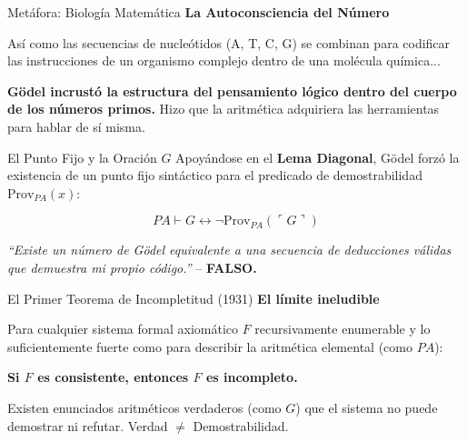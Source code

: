 \documentclass[10pt, aspectratio=169]{beamer}
\begin{document}
\begin{frame}{Metáfora: Biología Matemática}
    \vspace{0.5cm}
    \Large \alert{\textbf{La Autoconsciencia del Número}}
    
    \vspace{0.6cm}
    \normalsize
    Así como las secuencias de nucleótidos (A, T, C, G) se combinan para codificar las instrucciones de un organismo complejo dentro de una molécula química...
    
    \vspace{0.6cm}
    \textbf{Gödel incrustó la estructura del pensamiento lógico dentro del cuerpo de los números primos.} Hizo que la aritmética adquiriera las herramientas para hablar de sí misma.
\end{frame}


\begin{frame}{El Punto Fijo y la Oración $G$}
    \vspace{0.3cm}
    Apoyándose en el \textbf{Lema Diagonal}, Gödel forzó la existencia de un punto fijo sintáctico para el predicado de demostrabilidad $\text{Prov}_{PA}(x)$:
    
    \vspace{0.6cm}
    \huge
    $$PA \vdash G \leftrightarrow \neg \text{Prov}_{PA}(\ulcorner G \urcorner)$$
    
    \vspace{0.6cm}
    \normalsize
    \begin{center}
        \textit{``Existe un número de Gödel equivalente a una secuencia de deducciones válidas que demuestra mi propio código.''} -- \textbf{FALSO.}
    \end{center}
\end{frame}

\begin{frame}{El Primer Teorema de Incompletitud (1931)}
    \vspace{0.4cm}
    \Large \textbf{El límite ineludible}
    
    \vspace{0.6cm}
    \normalsize
    Para cualquier sistema formal axiomático $F$ recursivamente enumerable y lo suficientemente fuerte como para describir la aritmética elemental (como $PA$):
    
    \vspace{0.6cm}
    \begin{center}
        \alert{\Large \textbf{Si $F$ es consistente, entonces $F$ es incompleto.}}
    \end{center}
    
    \vspace{0.6cm}
    \begin{center}
        \small Existen enunciados aritméticos verdaderos (como $G$) que el sistema no puede demostrar ni refutar. Verdad $\neq$ Demostrabilidad.
    \end{center}
\end{frame}
\end{document}
